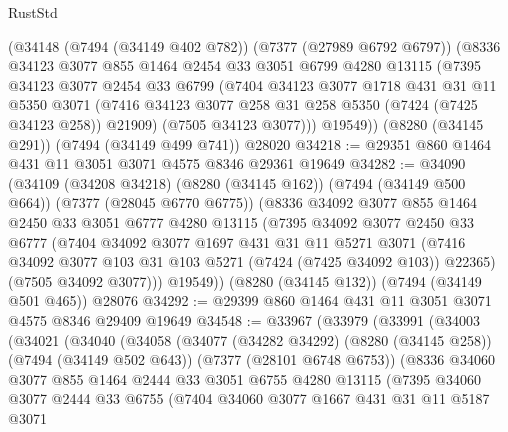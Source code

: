 \begin{lexlean}{RustStd}
\begin{coremodule}
    (@34148
      (@7494 (@34149 @402 @782))
      (@7377 (@27989 @6792 @6797))
      (@8336
        @34123
        @3077
        @855
        @1464
        @2454
        @33
        @3051
        @6799
        @4280
        @13115
        (@7395
          @34123
          @3077
          @2454
          @33
          @6799
          (@7404
            @34123
            @3077
            @1718
            @431
            @31
            @11
            @5350
            @3071
            (@7416 @34123 @3077 @258 @31 @258 @5350 (@7424 (@7425 @34123 @258)) @21909)
            (@7505 @34123 @3077)))
        @19549))
    (@8280 (@34145 @291))
    (@7494 (@34149 @499 @741))
    @28020
@34218 := @29351 @860 @1464 @431 @11 @3051 @3071 @4575 @8346 @29361 @19649
@34282 := @34090
    (@34109
      (@34208 @34218)
      (@8280 (@34145 @162))
      (@7494 (@34149 @500 @664))
      (@7377 (@28045 @6770 @6775))
      (@8336
        @34092
        @3077
        @855
        @1464
        @2450
        @33
        @3051
        @6777
        @4280
        @13115
        (@7395
          @34092
          @3077
          @2450
          @33
          @6777
          (@7404
            @34092
            @3077
            @1697
            @431
            @31
            @11
            @5271
            @3071
            (@7416 @34092 @3077 @103 @31 @103 @5271 (@7424 (@7425 @34092 @103)) @22365)
            (@7505 @34092 @3077)))
        @19549))
    (@8280 (@34145 @132))
    (@7494 (@34149 @501 @465))
    @28076
@34292 := @29399 @860 @1464 @431 @11 @3051 @3071 @4575 @8346 @29409 @19649
@34548 := @33967
    (@33979
      (@33991
        (@34003
          (@34021
            (@34040
              (@34058
                (@34077
                  (@34282 @34292)
                  (@8280 (@34145 @258))
                  (@7494 (@34149 @502 @643))
                  (@7377 (@28101 @6748 @6753))
                  (@8336
                    @34060
                    @3077
                    @855
                    @1464
                    @2444
                    @33
                    @3051
                    @6755
                    @4280
                    @13115
                    (@7395
                      @34060
                      @3077
                      @2444
                      @33
                      @6755
                      (@7404
                        @34060
                        @3077
                        @1667
                        @431
                        @31
                        @11
                        @5187
                        @3071

\end{coremodule}
\end{lexlean}
